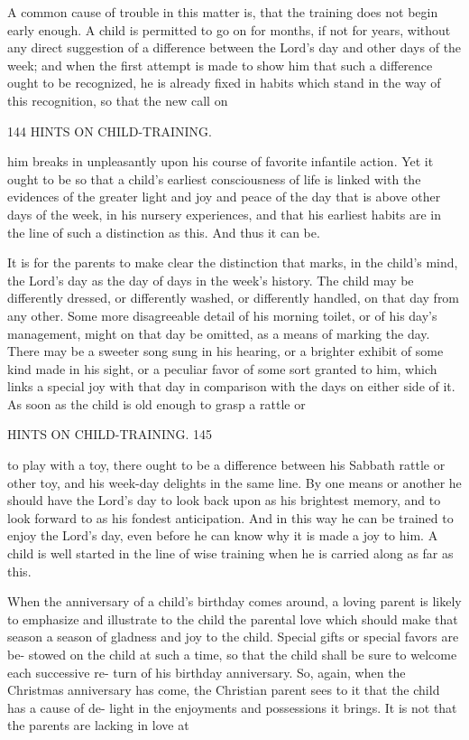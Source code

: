 \documentclass[
]{book}
\begin{document}
A common cause of trouble in this matter is, that the training does not begin early enough. A child is permitted to go on for months, if not for years, without any direct suggestion of a difference between the Lord's day and other days of the week; and when the first attempt is made to show him that such a difference ought to be recognized, he is already fixed in habits which stand in the way of this recognition, so that the new call on

144 HINTS ON CHILD-TRAINING.

him breaks in unpleasantly upon his course of favorite infantile action. Yet it ought to be so that a child's earliest consciousness of life is linked with the evidences of the greater light and joy and peace of the day that is above other days of the week, in his nursery experiences, and that his earliest habits are in the line of such a distinction as this. And thus it can be.

It is for the parents to make clear the distinction that marks, in the child's mind, the Lord's day as the day of days in the week's history. The child may be differently dressed, or differently washed, or differently handled, on that day from any other. Some more disagreeable detail of his morning toilet, or of his day's management, might on that day be omitted, as a means of marking the day. There may be a sweeter song sung in his hearing, or a brighter exhibit of some kind made in his sight, or a peculiar favor of some sort granted to him, which links a special joy with that day in comparison with the days on either side of it. As soon as the child is old enough to grasp a rattle or

HINTS ON CHILD-TRAINING. 145

to play with a toy, there ought to be a difference between his Sabbath rattle or other toy, and his week-day delights in the same line. By one means or another he should have the Lord's day to look back upon as his brightest memory, and to look forward to as his fondest anticipation. And in this way he can be trained to enjoy the Lord's day, even before he can know why it is made a joy to him. A child is well started in the line of wise training when he is carried along as far as this.

When the anniversary of a child's birthday comes around, a loving parent is likely to emphasize and illustrate to the child the parental love which should make that season a season of gladness and joy to the child. Special gifts or special favors are be- stowed on the child at such a time, so that the child shall be sure to welcome each successive re- turn of his birthday anniversary. So, again, when the Christmas anniversary has come, the Christian parent sees to it that the child has a cause of de- light in the enjoyments and possessions it brings. It is not that the parents are lacking in love at
\end{document}
